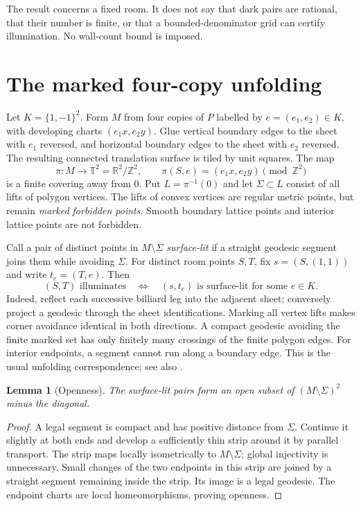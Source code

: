 \documentclass[11pt]{article}
\newtheorem{lemma}{Lemma}
\theoremstyle{remark}
\newcommand{\T}{\mathbb T}
\newcommand{\Z}{\mathbb Z}
\newcommand{\R}{\mathbb R}
\begin{document}
The result concerns a fixed room. It does not say that dark pairs are
rational, that their number is finite, or that a bounded-denominator grid
can certify illumination. No wall-count bound is imposed.

\section{The marked four-copy unfolding}
Let $K=\{1,-1\}^2$. Form $M$ from four copies of $P$ labelled by
$e=(e_1,e_2)\in K$, with developing charts $(e_1x,e_2y)$.
Glue vertical boundary edges to the sheet with $e_1$ reversed, and horizontal
boundary edges to the sheet with $e_2$ reversed. The resulting connected
translation surface is tiled by unit squares. The map
\[
 \pi:M\longrightarrow\T^2=\R^2/\Z^2,
 \qquad \pi(S,e)=(e_1x,e_2y)\pmod{\Z^2}
\]
is a finite covering away from $0$. Put $L=\pi^{-1}(0)$ and let
$\Sigma\subset L$ consist of all lifts of polygon vertices.
The lifts of convex vertices are regular metric points, but remain
\emph{marked forbidden points}. Smooth boundary lattice points and
interior lattice points are not forbidden.

Call a pair of distinct points in $M\setminus\Sigma$ \emph{surface-lit}
if a straight geodesic segment joins them while avoiding $\Sigma$.
For distinct room points $S,T$, fix $s=(S,(1,1))$ and write $t_e=(T,e)$.
Then
\begin{equation}\label{eq:unfold}
 (S,T)\text{ illuminates}\quad\Longleftrightarrow\quad
 (s,t_e)\text{ is surface-lit for some }e\in K.
\end{equation}
Indeed, reflect each successive billiard leg into the adjacent sheet;
conversely project a geodesic through the sheet identifications.
Marking all vertex lifts makes corner avoidance identical in both directions.
A compact geodesic avoiding the finite marked set has only finitely many
crossings of the finite polygon edges. For interior endpoints, a segment
cannot run along a boundary edge. This is the usual unfolding correspondence;
see also \cite[Lemma 2.1 and Remark 2.2]{Wolecki}.

\begin{lemma}[Openness]\label{lem:open}
The surface-lit pairs form an open subset of
$(M\setminus\Sigma)^2$ minus the diagonal.
\end{lemma}
\begin{proof}
A legal segment is compact and has positive distance from $\Sigma$.
Continue it slightly at both ends and develop a sufficiently thin strip
around it by parallel transport. The strip maps locally isometrically to
$M\setminus\Sigma$; global injectivity is unnecessary.
Small changes of the two endpoints in this strip are joined by a straight
segment remaining inside the strip. Its image is a legal geodesic.
The endpoint charts are local homeomorphisms, proving openness.
\end{proof}
\end{document}
